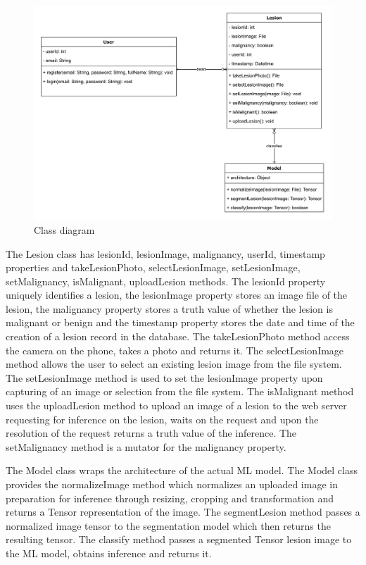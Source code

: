 \documentclass[12pt, a4paper]{article}
\begin{document}
\begin{figure}[h]
    \centering
    \setlength{\fboxsep}{8pt}
    \includegraphics[scale=0.1, fbox]{class-diagram.png}
    \caption{Class diagram}
    \label{fig:class-diagram}
\end{figure}

The Lesion class has lesionId, lesionImage, malignancy, userId, timestamp properties and takeLesionPhoto, selectLesionImage, setLesionImage, setMalignancy, isMalignant, uploadLesion methods. The lesionId property uniquely identifies a lesion, the lesionImage property stores an image file of the lesion, the malignancy property stores a truth value of whether the lesion is malignant or benign and the timestamp property stores the date and time of the creation of a lesion record in the database. The takeLesionPhoto method access the camera on the phone, takes a photo and returns it. The selectLesionImage method allows the user to select an existing lesion image from the file system. The setLesionImage method is used to set the lesionImage property upon capturing of an image or selection from the file system. The isMalignant method uses the uploadLesion method to upload an image of a lesion to the web server requesting for inference on the lesion, waits on the request and upon the resolution of the request returns a truth value of the inference. The setMalignancy method is a mutator for the malignancy property.

The Model class wraps the architecture of the actual ML model. The Model class provides the normalizeImage method which normalizes an uploaded image in preparation for inference through resizing, cropping and transformation and returns a Tensor representation of the image. The segmentLesion method passes a normalized image tensor to the segmentation model which then returns the resulting tensor. The classify method passes a segmented Tensor lesion image to the ML model, obtains inference and returns it.
\end{document}

